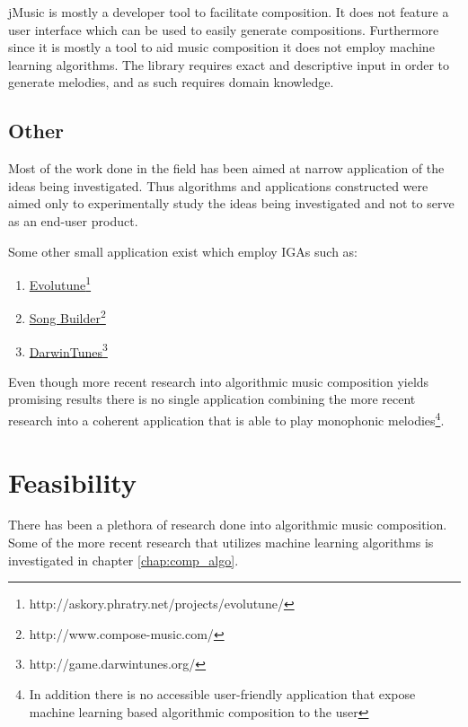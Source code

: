 jMusic is mostly a developer tool to facilitate composition. It does not feature a user interface which can be used to easily generate compositions. Furthermore since it is mostly a tool to aid music composition it does not employ machine learning algorithms. The library requires exact and descriptive input in order to generate melodies, and as such requires domain knowledge.

\subsection{Other}
Most of the work done in the field has been aimed at narrow application of the ideas being investigated. Thus algorithms and applications constructed were aimed only to experimentally study the ideas being investigated and not to serve as an end-user product. 

Some other small application exist which employ \acp{IGA} such as:
\begin{enumerate}
\item \href{http://askory.phratry.net/projects/evolutune/}{Evolutune}\footnote{http://askory.phratry.net/projects/evolutune/}
\item \href{http://www.compose-music.com/}{Song Builder}\footnote{http://www.compose-music.com/}
\item \href{http://game.darwintunes.org/}{DarwinTunes}\footnote{http://game.darwintunes.org/}
\end{enumerate}

Even though more recent research into algorithmic music composition yields promising results there is no single application combining the more recent research into a coherent application that is able to play monophonic melodies\footnote{In addition there is no accessible user-friendly application that expose machine learning based algorithmic composition to the user}.


\section{Feasibility}
There has been a plethora of research done into algorithmic music composition. Some of the more recent research that utilizes machine learning algorithms is investigated in chapter \ref{chap:comp_algo}.

